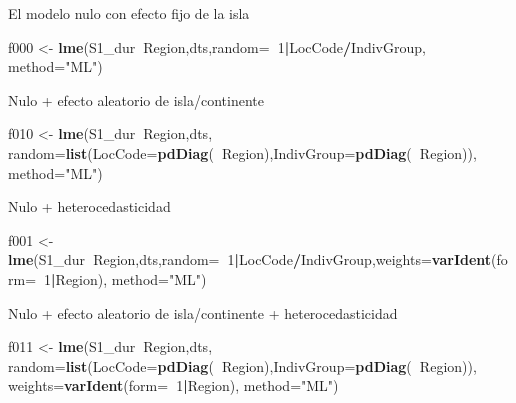 \documentclass[]{article}
\newenvironment{Shaded}{\begin{snugshade}}{\end{snugshade}}
\newcommand{\DataTypeTok}[1]{\textcolor[rgb]{0.13,0.29,0.53}{#1}}
\newcommand{\DecValTok}[1]{\textcolor[rgb]{0.00,0.00,0.81}{#1}}
\newcommand{\KeywordTok}[1]{\textcolor[rgb]{0.13,0.29,0.53}{\textbf{#1}}}
\newcommand{\NormalTok}[1]{#1}
\newcommand{\OperatorTok}[1]{\textcolor[rgb]{0.81,0.36,0.00}{\textbf{#1}}}
\newcommand{\StringTok}[1]{\textcolor[rgb]{0.31,0.60,0.02}{#1}}
\begin{document}
El modelo nulo con efecto fijo de la isla

\begin{Shaded}
\begin{Highlighting}[]
\NormalTok{f000 <-}\StringTok{ }\KeywordTok{lme}\NormalTok{(S1_dur}\OperatorTok{~}\NormalTok{Region,dts,}\DataTypeTok{random=}\OperatorTok{~}\DecValTok{1}\OperatorTok{|}\NormalTok{LocCode}\OperatorTok{/}\NormalTok{IndivGroup, }\DataTypeTok{method=}\StringTok{"ML"}\NormalTok{)}
\end{Highlighting}
\end{Shaded}

Nulo + efecto aleatorio de isla/continente

\begin{Shaded}
\begin{Highlighting}[]
\NormalTok{f010 <-}\StringTok{ }\KeywordTok{lme}\NormalTok{(S1_dur}\OperatorTok{~}\NormalTok{Region,dts,}
  \DataTypeTok{random=}\KeywordTok{list}\NormalTok{(}\DataTypeTok{LocCode=}\KeywordTok{pdDiag}\NormalTok{(}\OperatorTok{~}\NormalTok{Region),}\DataTypeTok{IndivGroup=}\KeywordTok{pdDiag}\NormalTok{(}\OperatorTok{~}\NormalTok{Region)), }\DataTypeTok{method=}\StringTok{"ML"}\NormalTok{)}
\end{Highlighting}
\end{Shaded}

Nulo + heterocedasticidad

\begin{Shaded}
\begin{Highlighting}[]
\NormalTok{f001 <-}\StringTok{ }\KeywordTok{lme}\NormalTok{(S1_dur}\OperatorTok{~}\NormalTok{Region,dts,}\DataTypeTok{random=}\OperatorTok{~}\DecValTok{1}\OperatorTok{|}\NormalTok{LocCode}\OperatorTok{/}\NormalTok{IndivGroup,}\DataTypeTok{weights=}\KeywordTok{varIdent}\NormalTok{(}\DataTypeTok{form=}\OperatorTok{~}\DecValTok{1}\OperatorTok{|}\NormalTok{Region), }\DataTypeTok{method=}\StringTok{"ML"}\NormalTok{)}
\end{Highlighting}
\end{Shaded}

Nulo + efecto aleatorio de isla/continente + heterocedasticidad

\begin{Shaded}
\begin{Highlighting}[]
\NormalTok{f011 <-}
\StringTok{ }\KeywordTok{lme}\NormalTok{(S1_dur}\OperatorTok{~}\NormalTok{Region,dts,}
   \DataTypeTok{random=}\KeywordTok{list}\NormalTok{(}\DataTypeTok{LocCode=}\KeywordTok{pdDiag}\NormalTok{(}\OperatorTok{~}\NormalTok{Region),}\DataTypeTok{IndivGroup=}\KeywordTok{pdDiag}\NormalTok{(}\OperatorTok{~}\NormalTok{Region)),}
   \DataTypeTok{weights=}\KeywordTok{varIdent}\NormalTok{(}\DataTypeTok{form=}\OperatorTok{~}\DecValTok{1}\OperatorTok{|}\NormalTok{Region), }\DataTypeTok{method=}\StringTok{"ML"}\NormalTok{)}
\end{Highlighting}
\end{Shaded}
\end{document}

